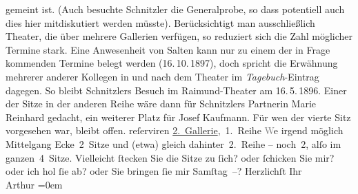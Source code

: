 \begin{ledgroupsized}[t]{13cm}
{{{                  gemeint ist. (Auch besuchte Schnitzler die Generalprobe, so dass
                  potentiell auch dies hier mitdiskutiert werden müsste). Berücksichtigt man ausschließlich Theater, die
                  über mehrere Gallerien verfügen, so reduziert sich die Zahl möglicher Termine stark. Eine Anwesenheit von
                  Salten kann nur zu einem der in Frage kommenden Termine belegt werden
                  (16. 10. 1897), doch spricht die Erwähnung
                  mehrerer anderer Kollegen in und nach dem Theater im \emph{Tagebuch}-Eintrag 
                  dagegen. So bleibt Schnitzlers Besuch
                  im Raimund-Theater am 16. 5. 1896.
                  Einer der Sitze in der anderen Reihe wäre dann für Schnitzlers Partnerin Marie Reinhard
                  gedacht, ein weiterer Platz für Josef Kaufmann. 
                  Für wen der vierte Sitz vorgesehen war, bleibt offen.}}}\label{K_L03035-1h} reſerviren\pend
           \pstart
           \uline{2. Gallerie}, 1. Reihe\pend
           \pstart
           \textcolor{gray}{W}e{\geminationn} irgend möglich Mittelgang
               Ecke 2 Sitze und \introOben{}(etwa)\introOben{} gleich dahinter 2. Reihe – noch 2,
               alſo {\pb}im ganzen 4 Sitze.\pend
           \pstart
           Vielleicht ſtecken Sie die Sitze zu ſich? oder ſchicken Sie mir? oder ich hol ſie ab?
               oder Sie bringen ſie mir Samſtag –?\pend
           \pstart
           Herzlichſt Ihr {\\[\baselineskip]}\spacefill\mbox{Arthur}\pend
           \leftskip=0em{}
         
         \endnumbering{}\end{ledgroupsized}  \newcommand{\dateiname}{L03035}\newcommand{\titel}{Arthur Schnitzler an Felix Salten, [14. 5. 1896?]}\newcommand{\editorInnen}{Martin Anton Müller und Laura Untner}
      